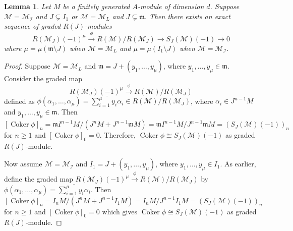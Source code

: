 \documentclass[11pt,reqno]{amsart}
\newtheorem{lemma}[theorem]{Lemma}
\theoremstyle{definition}
\newcommand{\m}{\mathfrak m}
\def\N{{\mathcal N}}
\def\R{{\mathcal R}}
\def\M{{\mathcal M}}
\def\I{{\mathcal I}}
\DeclareMathOperator{\coker}{Coker}
\numberwithin{equation}{section}
\begin{document}
\begin{lemma}\label{lemma-3.1(a)} Let $M$ be a finitely generated $A$-module of dimension $d$.  Suppose $\M=\M_\I$ and $J\subsetneq I_1$ or $\M=\M_L$ and $J\subsetneq \m.$ 
Then there exists an exact sequence of graded $R(J)$-modules
$$
    R(\M_J)(-1)^\mu\xrightarrow{\phi}R(\mathcal{M})/ R(\M_J)\to S_J(\M)(-1)\to 0
    $$ 
    where  $\mu=\mu(\m \setminus J)$ when $\M=\M_L$ and  $\mu=\mu(I_1\setminus J)$ when $\M=\M_\I.$ 
\end{lemma}
\begin{proof}
 Suppose $\M=\M_L$ and  $\m =J+(y_1,\ldots,y_\mu)$, where $y_1,\ldots,y_\mu \in \m$. Consider the graded map 
	$$R(\M_J)(-1)^\mu\xrightarrow{\phi} R(\mathcal{M})/R(\M_J)$$
	defined as $\phi(\alpha_1,\ldots,\alpha_\mu )=\overline{\mathop\sum\limits_{i=1}^\mu y_i \alpha_i }\in R(\mathcal{M})/R(\M_J)$, where $\alpha_i \in J^{n-1}M $ and $y_1,\ldots,y_{\mu}\in \m $. Then
	$[\coker \phi]_{n}=\m I^{n-1}M/(J^nM+J^{n-1}\m M)=\m I^{n-1}M/J^{n-1}\m M=(S_J(\M)(-1))_{n}$ for $n\geq 1$ and
	$[\coker \phi]_{0}=0$. Therefore,
	$\coker \phi\cong S_J(\M)(-1)$ as graded $R(J)$-module.

    Now assume $\M=\M_\I$ and $I_1=J+(y_1,\ldots,y_\mu)$, where $y_1,\ldots,y_\mu \in I_1$. As earlier, define the graded map $R(\M_J)(-1)^\mu\xrightarrow{\phi} R(\mathcal{M})/R(\M_J)$ by  $\phi(\alpha_1,\ldots,\alpha_\mu )=\overline{\mathop\sum\limits_{i=1}^\mu y_i \alpha_i}$. Then $[\coker \phi]_{n}=I_{n}M/(J^nM+J^{n-1}I_1M)=I_{n}M/J^{n-1}I_1M=(S_J(\M)(-1))_{n}$ for $n\geq 1$ and
	$[\coker \phi]_{0}=0$ which gives 
	$\coker \phi\cong S_J(\M)(-1)$ as graded $R(J)$-module.
\end{proof}
\end{document}
